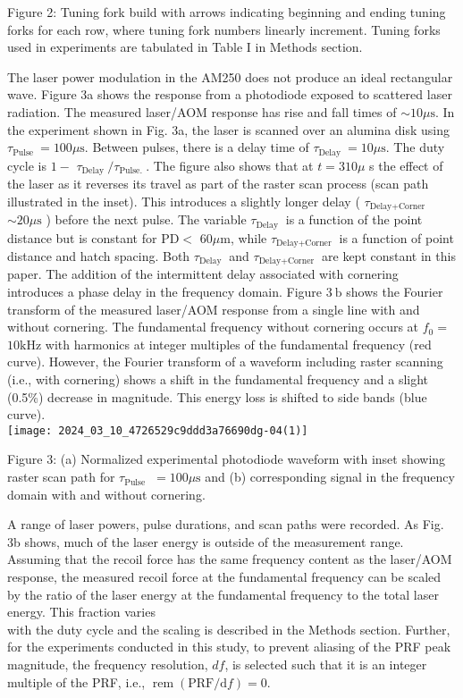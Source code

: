 \documentclass[10pt]{article}
\begin{document}
Figure 2: Tuning fork build with arrows indicating beginning and ending tuning forks for each row, where tuning fork numbers linearly increment. Tuning forks used in experiments are tabulated in Table I in Methods section.

The laser power modulation in the AM250 does not produce an ideal rectangular wave. Figure 3a shows the response from a photodiode exposed to scattered laser radiation. The measured laser/AOM response has rise and fall times of $\sim 10 \mu \mathrm{s}$. In the experiment shown in Fig. 3a, the laser is scanned over an alumina disk using $\tau_{\text {Pulse }}=100 \mu \mathrm{s}$. Between pulses, there is a delay time of $\tau_{\text {Delay }}=10 \mu \mathrm{s}$. The duty cycle is $1-$ $\tau_{\text {Delay }} / \tau_{\text {Pulse. }}$. The figure also shows that at $t=310 \mu$ s the effect of the laser as it reverses its travel as part of the raster scan process (scan path illustrated in the inset). This introduces a slightly longer delay ( $\tau_{\text {Delay+Corner }}$ $\sim 20 \mu \mathrm{s}$ ) before the next pulse. The variable $\tau_{\text {Delay }}$ is a function of the point distance but is constant for $\mathrm{PD}<$ $60 \mu \mathrm{m}$, while $\tau_{\text {Delay+Corner }}$ is a function of point distance and hatch spacing. Both $\tau_{\text {Delay }}$ and $\tau_{\text {Delay+Corner }}$ are kept constant in this paper. The addition of the intermittent delay associated with cornering introduces a phase delay in the frequency domain. Figure $3 \mathrm{~b}$ shows the Fourier transform of the measured laser/AOM response from a single line with and without cornering. The fundamental frequency without cornering occurs at $f_{0}=$ $10 \mathrm{kHz}$ with harmonics at integer multiples of the fundamental frequency (red curve). However, the Fourier transform of a waveform including raster scanning (i.e., with cornering) shows a shift in the fundamental frequency and a slight (0.5\%) decrease in magnitude. This energy loss is shifted to side bands (blue curve).\\
\texttt{[image: 2024\_03\_10\_4726529c9ddd3a76690dg-04(1)]}

Figure 3: (a) Normalized experimental photodiode waveform with inset showing raster scan path for $\tau_{\text {Pulse }}$ $=100 \mu \mathrm{s}$ and (b) corresponding signal in the frequency domain with and without cornering.

A range of laser powers, pulse durations, and scan paths were recorded. As Fig. 3b shows, much of the laser energy is outside of the measurement range. Assuming that the recoil force has the same frequency content as the laser/AOM response, the measured recoil force at the fundamental frequency can be scaled by the ratio of the laser energy at the fundamental frequency to the total laser energy. This fraction varies\\
with the duty cycle and the scaling is described in the Methods section. Further, for the experiments conducted in this study, to prevent aliasing of the PRF peak magnitude, the frequency resolution, $d f$, is selected such that it is an integer multiple of the PRF, i.e., $\operatorname{rem}(\mathrm{PRF} / \mathrm{d} f)=0$.
\end{document}
